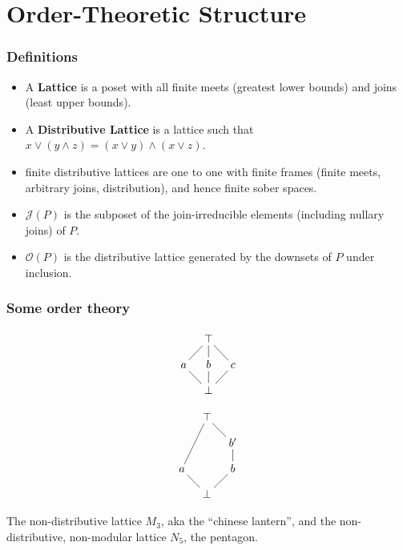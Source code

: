 \documentclass{beamer}
\newcommand{\Oc}{\mathcal{O}}
\newcommand{\Jc}{\mathcal{J}}
\begin{document}
\section{Order-Theoretic Structure}

\begin{frame}
\frametitle{Definitions}
\begin{itemize}
\item A \textbf{Lattice} is a poset with all finite meets (greatest lower bounds) and joins (least upper bounds).

\item A \textbf{Distributive Lattice} is a lattice such that \(x \vee (y \wedge z) = (x \vee y) \wedge (x \vee z)\).

\item finite distributive lattices are one to one with finite frames (finite meets, arbitrary joins, distribution), and hence finite sober spaces.

\item \textbf{\(\Jc(P)\)} is the subposet of the join-irreducible elements (including nullary joins) of \(P\).

\item \textbf{\(\Oc(P)\)} is the distributive lattice generated by the downsets of \(P\) under inclusion.
\end{itemize}
\end{frame}

\begin{frame}
\frametitle{Some order theory}
\begin{figure}
\begin{minipage}[c]{0.3\textwidth}
\begin{equation*}
    \xymatrix@=1em{& \top \ar@{-}[dl] \ar@{-}[d] \ar@{-}[dr] & \\
      a \ar@{-}[dr] & b \ar@{-}[d] & c \ar@{-}[dl]  \\
       & \bot &}
\end{equation*}
\end{minipage}
\begin{minipage}[c]{0.3\textwidth}
\begin{equation*}
    \xymatrix@=1em{& \top \ar@{-}[ddl] \ar@{-}[dr] & \\
      & & b'  \ar@{-}[d]  \\
      a \ar@{-}[dr] & & b \ar@{-}[dl] \\
      & \bot &}
\end{equation*}
\end{minipage}
\end{figure}

The non-distributive lattice \(M_3\), aka the ``chinese lantern'', and the non-distributive, non-modular lattice \(N_5\), the pentagon.


\end{frame}
\end{document}
